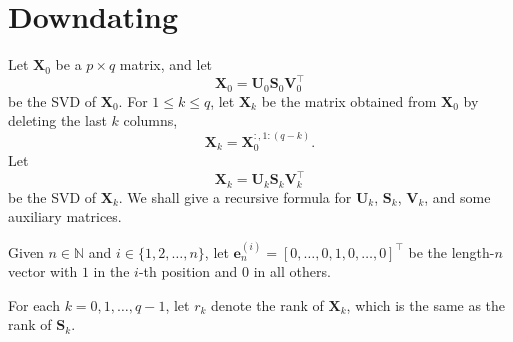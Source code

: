 \documentclass[11pt,a4paper]{article}
\theoremstyle{mybreak}
\numberwithin{dummy}{section}
\theoremstyle{plain}
\theoremstyle{plain}
\theoremstyle{plain}
\theoremstyle{plain}
\theoremstyle{MyNonumberplain}
\newcommand{\0}{\M{0}}
\newcommand{\M}[1]{\mathbf{#1}}
\newcommand{\Mt}[1]{\tilde{\M{#1}}}
\newcommand{\N}{\mathbb{N}}
\newcommand{\T}{\top}
\newcommand{\eve}[2]{\mathbf{e}^{(#1)}_{#2}}
\begin{document}

\section{Downdating}

Let $\M{X}_0$ be a $p \times q$ matrix, and let
\begin{displaymath}
  \M{X}_0 = \M{U}_0 \M{S}_0 \M{V}_0^\T
\end{displaymath}
be the SVD of $\M{X}_0$.  For $1 \leq k \leq q$, let $\M{X}_k$ be the matrix obtained from $\M{X}_0$ by deleting the last $k$ columns,
\begin{displaymath}
  \M{X}_k = \M{X}_0^{:,1:(q -k)}.
\end{displaymath}
Let
\begin{displaymath}
  \M{X}_k = \M{U}_k \M{S}_k\M{V}_k^\T
\end{displaymath}
be the SVD of $\M{X}_k$. We shall give a recursive formula for $\M{U}_k$, $\M{S}_k$, $\M{V}_k$, and some auxiliary matrices.

Given $n \in \N$ and $i \in \{1,2, \dots, n\}$, let $\eve{i}{n} = [0, \dots, 0, 1, 0, \dots, 0]^\T$ be the length-$n$ vector with $1$ in the $i$-th position and $0$ in all others.

For each $k = 0, 1, \dots, q-1$, let $r_k$ denote the rank of $\M{X}_k$, which is the same as the rank of $\M{S}_k$.
\end{document}
